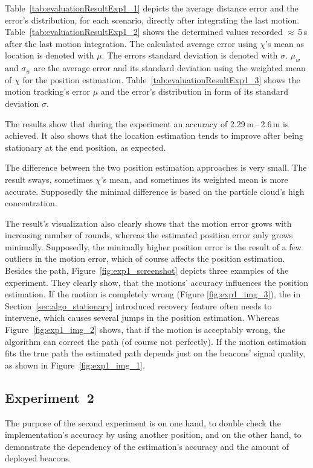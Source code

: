 Table~\ref{tab:evaluationResultExp1_1} depicts the average distance error and the error's distribution, for each scenario, directly after integrating the last motion. Table~\ref{tab:evaluationResultExp1_2} shows the determined values recorded $\approx$\,5\,s after the last motion integration. The calculated average error using $\chi$'s mean as location is denoted with $\mu$. The errors standard deviation is denoted with $\sigma$. $\mu_w$ and $\sigma_w$ are the average error and its standard deviation using the weighted mean of $\chi$ for the position estimation.
Table~\ref{tab:evaluationResultExp1_3} shows the motion tracking's error $\mu$ and the error's distribution in form of its standard deviation $\sigma$.

The results show that during the experiment an accuracy of 2.29\,m\,--\,2.6\,m is achieved. It also shows that the location estimation tends to improve after being stationary at the end position, as expected.

The difference between the two position estimation approaches is very small. The result sways, sometimes $\chi$'s mean, and sometimes its weighted mean is more accurate. Supposedly the minimal difference is based on the particle cloud's high concentration.

The result's visualization also clearly shows that the motion error grows with increasing number of rounds, whereas the estimated position error only grows minimally. Supposedly, the minimally higher position error is the result of a few outliers in the motion error, which of course affects the position estimation. Besides the path, Figure~\ref{fig:exp1_screenshot} depicts three examples of the experiment. They clearly show, that the motions' accuracy influences the position estimation. If the motion is completely wrong (Figure \ref{fig:exp1_img_3}), the in Section~\ref{sec:algo_stationary} introduced recovery feature often needs to intervene, which causes several jumps in the position estimation. Whereas Figure~\ref{fig:exp1_img_2} shows, that if the motion is acceptably wrong, the algorithm can correct the path (of course not perfectly). If the motion estimation fits the true path the estimated path depends just on the beacons' signal quality, as shown in Figure~\ref{fig:exp1_img_1}.

\subsection*{Experiment~2}
The purpose of the second experiment is on one hand, to double check the implementation's accuracy by using another position, and on the other hand, to demonstrate the dependency of the estimation's accuracy and the amount of deployed beacons.

